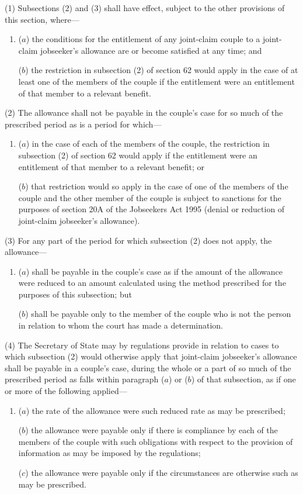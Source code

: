 \documentclass[12pt,a4paper]{article}
\begin{document}
(1) Subsections (2)  and (3)  shall have effect, subject to the other provisions of this section, where—
\begin{enumerate}\item[]
($a$) the conditions for the entitlement of any joint-claim couple to a joint-claim jobseeker’s allowance are or become satisfied at any time; and

($b$) the restriction in subsection (2)  of section 62 would apply in the case of at least one of the members of the couple if the entitlement were an entitlement of that member to a relevant benefit.
\end{enumerate}

(2) The allowance shall not be payable in the couple’s case for so much of the prescribed period as is a period for which—
\begin{enumerate}\item[]
($a$) in the case of each of the members of the couple, the restriction in subsection (2)  of section 62 would apply if the entitlement were an entitlement of that member to a relevant benefit; or

($b$) that restriction would so apply in the case of one of the members of the couple and the other member of the couple is subject to sanctions for the purposes of section 20A of the Jobseekers Act 1995 (denial or reduction of joint-claim jobseeker’s allowance).
\end{enumerate}

(3) For any part of the period for which subsection (2)  does not apply, the allowance—
\begin{enumerate}\item[]
($a$) shall be payable in the couple’s case as if the amount of the allowance were reduced to an amount calculated using the method prescribed for the purposes of this subsection; but

($b$) shall be payable only to the member of the couple who is not the person in relation to whom the court has made a determination.
\end{enumerate}

(4) The Secretary of State may by regulations provide in relation to cases to which subsection (2)  would otherwise apply that joint-claim jobseeker’s allowance shall be payable in a couple’s case, during the whole or a part of so much of the prescribed period as falls within paragraph ($a$)  or ($b$)  of that subsection, as if one or more of the following applied—
\begin{enumerate}\item[]
($a$) the rate of the allowance were such reduced rate as may be prescribed;

($b$) the allowance were payable only if there is compliance by each of the members of the couple with such obligations with respect to the provision of information as may be imposed by the regulations;

($c$) the allowance were payable only if the circumstances are otherwise such as may be prescribed.
\end{enumerate}
\end{document}
